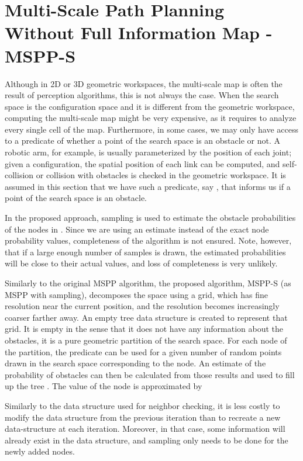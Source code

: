 \documentclass[letterpaper, 10 pt, conference]{ieeeconf}
\theoremstyle{definition}
\begin{document}
\section{Multi-Scale Path Planning Without Full Information Map - MSPP-S}

Although in 2D or 3D geometric workspaces, the multi-scale map is often the result of perception algorithms, this is not always the case.
When the search space is the configuration space and it is different from the geometric workspace, computing the multi-scale map might be very expensive, as it requires to analyze every single cell of the map.
Furthermore, in some cases, we may only have access to a predicate of whether a point of the search space is an obstacle or not.
A robotic arm, for example, is usually parameterized by the position of each joint; given a configuration, the spatial position of each link can be computed, and self-collision or collision with obstacles is checked in the geometric workspace.
It is assumed in this section that we have such a predicate, say , that informs us if a point  of the search space is an obstacle.

In the proposed approach, sampling is used to estimate the obstacle probabilities of the nodes in .
Since we are using an estimate instead of the exact node probability values, completeness of the algorithm is not ensured.
Note, however, that if a large enough number of samples is drawn, the estimated probabilities will be close to their actual values,
and loss of completeness is very unlikely.

Similarly to the original MSPP algorithm, the proposed algorithm, MSPP-S (as MSPP with sampling), decomposes the space using a grid, which
has fine resolution near the current position, and the resolution becomes increasingly coarser farther away.
An empty tree data structure  is created to represent that grid.
It is empty in the sense that it does not have any information about the obstacles, it is a pure geometric partition of the search space.
For each node  of the partition, the predicate can be used for a given number  of random points drawn in the search space corresponding to the node.
An estimate of the probability of obstacles can then be calculated from those results and used to fill up the tree .
The value of the node is approximated by

Similarly to the data structure used for neighbor checking, it is less costly to modify the data structure from the previous iteration than to recreate a new data-structure at each iteration.
Moreover, in that case, some information will already exist in the data structure, and sampling only needs to be done for the newly added nodes. 
\end{document}
